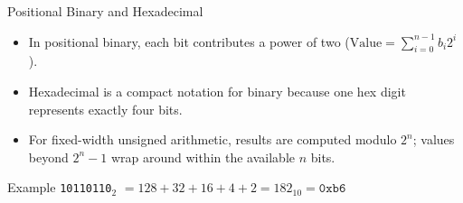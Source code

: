 \documentclass[aspectratio=169,11pt,t]{beamer}
\newcommand{\bits}[1]{\texttt{#1}}
\newcommand{\hex}[1]{\texttt{0x#1}}
\begin{document}
\begin{frame}{Positional Binary and Hexadecimal}

\begin{itemize}\setlength{\itemsep}{5pt}
  \item In positional binary, each bit contributes a power of two ($\text{Value} = \sum_{i=0}^{n-1} b_i 2^i$).
  \item Hexadecimal is a compact notation for binary because one hex digit represents exactly four bits.
  \item For fixed-width unsigned arithmetic, results are computed modulo $2^n$; values beyond $2^n-1$ wrap around within the available $n$ bits.
\end{itemize}

\vfill

\begin{block}{Example}
\centering
\bits{10110110}$_2$
$=
128 + 32 + 16 + 4 + 2
=
182_{10}
=
\hex{b6}$
\end{block}

\end{frame}





\end{document}
